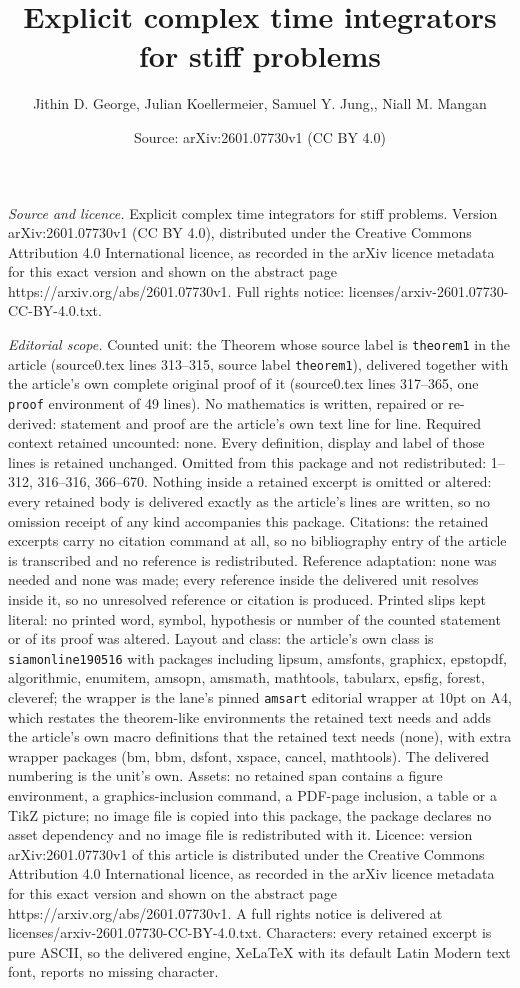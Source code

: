 \documentclass[10pt,a4paper]{amsart}
\title[Explicit complex time integrators for stiff problems]{Explicit complex time integrators for stiff problems}
\author{Jithin D. George, Julian Koellermeier, Samuel Y. Jung,, Niall M. Mangan}
\date{Source: arXiv:2601.07730v1 (CC BY 4.0)}
\begin{document}
\maketitle

\noindent\emph{Source and licence.} Explicit complex time integrators for stiff problems. Version arXiv:2601.07730v1 (CC BY 4.0), distributed under the Creative Commons Attribution 4.0 International licence, as recorded in the arXiv licence metadata for this exact version and shown on the abstract page https://arxiv.org/abs/2601.07730v1. Full rights notice: licenses/arxiv-2601.07730-CC-BY-4.0.txt.\par\smallskip

\noindent\textit{Editorial scope.} Counted unit: the Theorem whose source label is \texttt{theorem1} in the article (source0.tex lines 313--315, source label \texttt{theorem1}), delivered together with the article's own complete original proof of it (source0.tex lines 317--365, one \texttt{proof} environment of 49 lines). No mathematics is written, repaired or re-derived: statement and proof are the article's own text line for line. Required context retained uncounted: none. Every definition, display and label of those lines is retained unchanged. Omitted from this package and not redistributed: 1--312, 316--316, 366--670. Nothing inside a retained excerpt is omitted or altered: every retained body is delivered exactly as the article's lines are written, so no omission receipt of any kind accompanies this package. Citations: the retained excerpts carry no citation command at all, so no bibliography entry of the article is transcribed and no reference is redistributed. Reference adaptation: none was needed and none was made; every reference inside the delivered unit resolves inside it, so no unresolved reference or citation is produced. Printed slips kept literal: no printed word, symbol, hypothesis or number of the counted statement or of its proof was altered. Layout and class: the article's own class is \texttt{siamonline190516} with packages including lipsum, amsfonts, graphicx, epstopdf, algorithmic, enumitem, amsopn, amsmath, mathtools, tabularx, epsfig, forest, cleveref; the wrapper is the lane's pinned \texttt{amsart} editorial wrapper at 10pt on A4, which restates the theorem-like environments the retained text needs and adds the article's own macro definitions that the retained text needs (none), with extra wrapper packages (bm, bbm, dsfont, xspace, cancel, mathtools). The delivered numbering is the unit's own. Assets: no retained span contains a figure environment, a graphics-inclusion command, a PDF-page inclusion, a table or a TikZ picture; no image file is copied into this package, the package declares no asset dependency and no image file is redistributed with it. Licence: version arXiv:2601.07730v1 of this article is distributed under the Creative Commons Attribution 4.0 International licence, as recorded in the arXiv licence metadata for this exact version and shown on the abstract page https://arxiv.org/abs/2601.07730v1. A full rights notice is delivered at licenses/arxiv-2601.07730-CC-BY-4.0.txt. Characters: every retained excerpt is pure ASCII, so the delivered engine, XeLaTeX with its default Latin Modern text font, reports no missing character.
\end{document}
